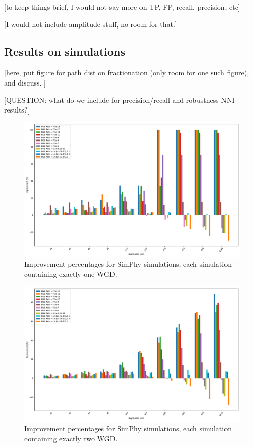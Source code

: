 \documentclass[10pt]{article}
\newcommand{\ml}[1]{\begingroup\color{blue}#1\endgroup}
\begin{document}
\ml{[to keep things brief, I would not say more on TP, FP, recall, precision, etc]}

\ml{[I would not include amplitude stuff, no room for that.]}



\subsection{Results on simulations}

\ml{[here, put figure for path dist on fractionation (only room for one such figure), and discuss.  ]}

\ml{[QUESTION: what do we include for precision/recall and robustness NNI results?]}

\begin{figure}[hbt!]
    \centering
    \includegraphics[width=1\textwidth]{figs/imp_1WGD.pdf}
    \caption{Improvement percentages for SimPhy simulations, each simulation containing exactly one WGD.}
    \label{fig:imp_1wgd}
\end{figure}

\begin{figure}[hbt!]
    \centering
    \includegraphics[width=1\textwidth]{figs/imp_2WGD.pdf}
    \caption{Improvement percentages for SimPhy simulations, each simulation containing exactly two WGD.}
    \label{fig:imp_2wgd}
\end{figure}
\end{document}

